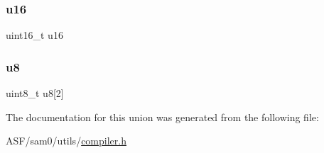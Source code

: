 \mbox{\label{union_union16_a1234f83efa812e259523c91799614a3c}} 
\subsubsection{\texorpdfstring{u16}{u16}}
{\footnotesize\ttfamily uint16\+\_\+t u16}

\mbox{\label{union_union16_ab3d8a7b8ba33f3e22f0dc5376bdbee6d}} 
\subsubsection{\texorpdfstring{u8}{u8}}
{\footnotesize\ttfamily uint8\+\_\+t u8\mbox{[}2\mbox{]}}



The documentation for this union was generated from the following file\+:\begin{DoxyCompactItemize}
\item 
A\+S\+F/sam0/utils/\mbox{\hyperlink{compiler_8h}{compiler.\+h}}\end{DoxyCompactItemize}
